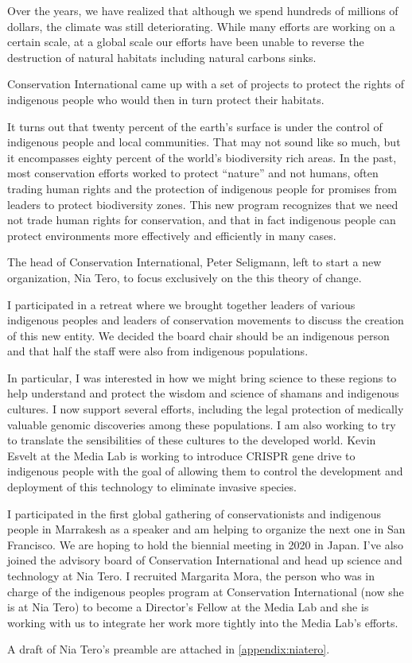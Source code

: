 Over the years, we have realized that although we spend hundreds of millions of dollars, the climate was still deteriorating. While many efforts are working on a certain scale, at a global scale our efforts have been unable to reverse the destruction of natural habitats including natural carbons sinks.

Conservation International came up with a set of projects to protect the rights of indigenous people who would then in turn protect their habitats.

It turns out that twenty percent of the earth's surface is under the control of indigenous people and local communities. That may not sound like so much, but it encompasses eighty percent of the world's biodiversity rich areas. In the past, most conservation efforts worked to protect ``nature'' and not humans, often trading human rights and the protection of indigenous people for promises from leaders to protect biodiversity zones. This new program recognizes that we need not trade human rights for conservation, and that in fact indigenous people can protect environments more effectively and efficiently in many cases.

The head of Conservation International, Peter Seligmann, left to start a new organization, Nia Tero, to focus exclusively on the this theory of change.

I participated in a retreat where we brought together leaders of various indigenous peoples and leaders of conservation movements to discuss the creation of this new entity. We decided the board chair should be an indigenous person and that half the staff were also from indigenous populations.

In particular, I was interested in how we might bring science to these regions to help understand and protect the wisdom and science of shamans and indigenous cultures. I now support several efforts, including the legal protection of medically valuable genomic discoveries among these populations. I am also working to try to translate the sensibilities of these cultures to the developed world. Kevin Esvelt at the Media Lab is working to introduce CRISPR gene drive to indigenous people with the goal of allowing them to control the development and deployment of this technology to eliminate invasive species.

I participated in the first global gathering of conservationists and indigenous people in Marrakesh as a speaker and am helping to organize the next one in San Francisco. We are hoping to hold the biennial meeting in 2020 in Japan. I've also joined the advisory board of Conservation International and head up science and technology at Nia Tero. I recruited Margarita Mora, the person who was in charge of the indigenous peoples program at Conservation International (now she is at Nia Tero) to become a Director's Fellow at the Media Lab and she is working with us to integrate her work more tightly into the Media Lab's efforts.

A draft of Nia Tero's preamble are attached in \autoref{appendix:niatero}.
